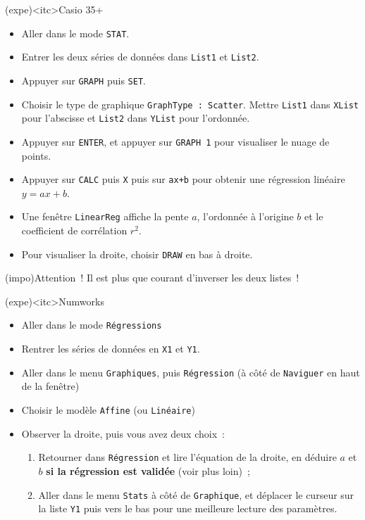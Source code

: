 \documentclass[a4paper, 12pt, garamond]{book}
\begin{document}
\begin{tcn}[breakable](expe)<itc>{Casio 35+}
	\begin{itemize}
		\item Aller dans le mode \texttt{STAT}.
		\item Entrer les deux séries de données dans \texttt{List1} et
		      \texttt{List2}.
		\item Appuyer sur \texttt{GRAPH} puis \texttt{SET}.
		\item Choisir le type de graphique \texttt{GraphType~: Scatter}. Mettre
		      \texttt{List1} dans \texttt{XList} pour l'abscisse et \texttt{List2}
		      dans \texttt{YList} pour l'ordonnée.
		\item Appuyer sur \texttt{ENTER}, et appuyer sur \texttt{GRAPH 1} pour
		      visualiser le nuage de points.
		\item Appuyer sur \texttt{CALC} puis \texttt{X} puis sur \texttt{ax+b} pour
		      obtenir une régression linéaire $y = ax+b$.
		\item Une fenêtre \texttt{LinearReg} affiche la pente $a$, l'ordonnée à
		      l'origine $b$ et le coefficient de corrélation $r^{2}$.
		\item Pour visualiser la droite, choisir \texttt{DRAW} en bas à droite.
	\end{itemize}
\end{tcn}

\begin{tcn}(impo){Attention~!}
	Il est plus que courant d'inverser les deux listes~!
\end{tcn}

\begin{tcn}[breakable](expe)<itc>{Numworks}
  \begin{itemize}
    \item Aller dans le mode \texttt{Régressions}
    \item Rentrer les séries de données en \texttt{X1} et \texttt{Y1}.
    \item Aller dans le menu \texttt{Graphiques}, puis \texttt{Régression} (à
      côté de \texttt{Naviguer} en haut de la fenêtre)
    \item Choisir le modèle \texttt{Affine} (ou \texttt{Linéaire})
    \item Observer la droite, puis vous avez deux choix~:
      \begin{enumerate}
        \item Retourner dans \texttt{Régression} et lire l'équation de la
          droite, en déduire $a$ et $b$ \textbf{si la régression est validée}
          (voir plus loin)~;
        \item Aller dans le menu \texttt{Stats} à côté de \texttt{Graphique}, et
          déplacer le curseur sur la liste \texttt{Y1} puis vers le bas pour une
          meilleure lecture des paramètres.
      \end{enumerate}
  \end{itemize}
\end{tcn}
\end{document}
